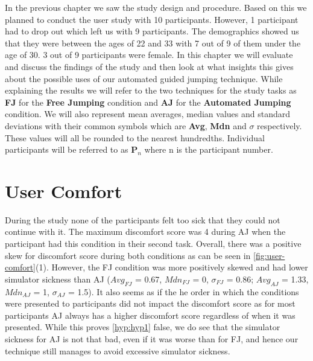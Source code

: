 \label{Chapter:Evaluation of the User Study}
In the previous chapter we saw the study design and procedure. Based on this we planned to conduct the user study with 10 participants. However, 1 participant had to drop out which left us with 9 participants. The demographics showed us that they were between the ages of 22 and 33 with 7 out of 9 of them under the age of 30. 3 out of 9 participants were female. In this chapter we will evaluate and discuss the findings of the study and then look at what insights this gives about the possible uses of our automated guided jumping technique. While explaining the results we will refer to the two techniques for the study tasks as \textbf{FJ} for the \textbf{Free Jumping} condition and \textbf{AJ} for the \textbf{Automated Jumping} condition. We will also represent mean averages, median values and standard deviations with their common symbols which are \textbf{Avg}, \textbf{Mdn} and \textbf{$\sigma$} respectively. These values will all be rounded to the nearest hundredths. Individual participants will be referred to as \textbf{P}$_n$ where n is the participant number.

\section{User Comfort}
\label{subsection EUS: User Comfort}
During the study none of the participants felt too sick that they could not continue with it. The maximum discomfort score was 4 during AJ when the participant had this condition in their second task. Overall, there was a positive skew for discomfort score during both conditions as can be seen in \cref{fig:user-comfort}(1). However, the FJ condition was more positively skewed and had lower simulator sickness than AJ ($Avg_{FJ}$ = 0.67, $Mdn_{FJ}$ = 0, $\sigma_{FJ}$ = 0.86; $Avg_{AJ}$ = 1.33, $Mdn_{AJ}$ = 1, $\sigma_{AJ}$ = 1.5). It also seems as if the he order in which the conditions were presented to participants did not impact the discomfort score as for most participants AJ always has a higher discomfort score regardless of when it was presented. While this proves \cref{hyp:hyp1} false, we do see that the simulator sickness for AJ is not that bad, even if it was worse than for FJ, and hence our technique still manages to avoid excessive simulator sickness.

